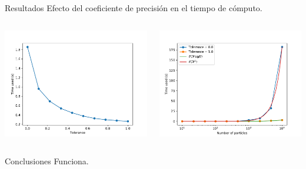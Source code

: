 \documentclass{beamer}
\begin{document}
\begin{frame}{Resultados}
	Efecto del coeficiente de precisi\'on en el tiempo de c\'omputo.
	\begin{columns}
		\begin{column}{0.5\textwidth}
			\includegraphics[width=\linewidth]{sources/images/Tolerance_results.pdf}
		\end{column}
		\begin{column}{0.5\textwidth}
			\includegraphics[width=\linewidth]{sources/images/Particles_results.pdf}
		\end{column}
	\end{columns}
\end{frame}
\begin{frame}{Conclusiones}
	Funciona.
\end{frame}
\end{document}
